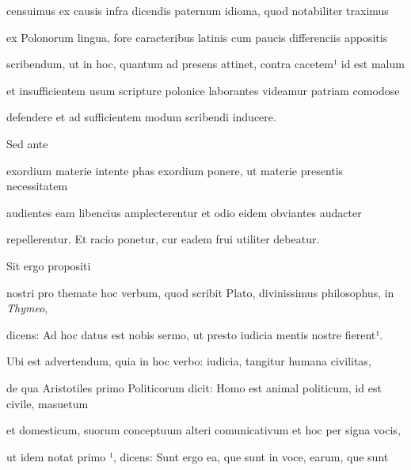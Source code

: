 censuimus ex causis infra dicendis paternum idioma, quod notabiliter traximus

ex Polonorum lingua, fore caracteribus latinis cum paucis differenciis appositis

scribendum, ut in hoc, quantum ad presens attinet, contra cacetem¹ id est malum

et insufficientem usum scripture polonice laborantes videamur patriam comodose

\splitlines{}
defendere et ad sufficientem modum scribendi inducere.

\indentK Sed ante

\fulllines{}

exordium materie intente phas exordium ponere, ut materie presentis necessitatem

audientes eam libencius amplecterentur et odio eidem obviantes audacter

\splitlines{}
repellerentur. Et racio ponetur, cur eadem frui utiliter debeatur.

\indentK Sit ergo propositi



\fulllines{}

nostri pro themate hoc verbum, quod scribit Plato, divinissimus philosophus, in \textit{Thymeo},


dicens: Ad hoc datus est nobis sermo, ut presto iudicia mentis nostre fierent¹.

Ubi est advertendum, quia in hoc verbo: iudicia, tangitur humana civilitas,

de qua Aristotiles primo Politicorum dicit: Homo est animal politicum, id est civile, masuetum

et domesticum, suorum conceptuum alteri comunicativum et hoc per signa vocis,


ut idem notat primo  ¹, dicens: Sunt ergo ea, que sunt in voce, earum, que sunt

